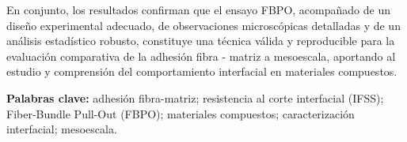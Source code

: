 En conjunto, los resultados confirman que el ensayo FBPO, acompañado de un diseño experimental
adecuado, de observaciones microscópicas detalladas y de un análisis estadístico robusto,
constituye una técnica válida y reproducible para la evaluación comparativa de la adhesión
fibra - matriz a mesoescala, aportando al estudio y comprensión del comportamiento interfacial
en materiales compuestos.

\noindent\textbf{Palabras clave:} adhesión fibra-matriz; resistencia al corte interfacial (IFSS);
Fiber-Bundle Pull-Out (FBPO); materiales compuestos; caracterización interfacial; mesoescala.
